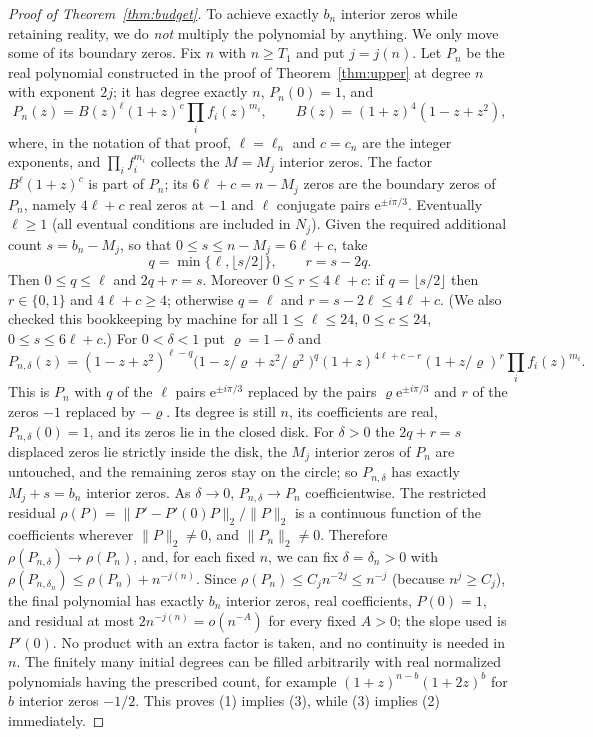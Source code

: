\documentclass[11pt]{article}
\theoremstyle{remark}\newtheorem{remark}[theorem]{Remark}
\newcommand{\norm}[1]{\lVert #1\rVert}
\newcommand{\ee}{\mathrm e}
\begin{document}
\begin{proof}[Proof of Theorem~\ref{thm:budget}]
To achieve exactly \(b_n\) interior zeros while retaining reality,
we do \emph{not} multiply the polynomial by anything. We only move
some of its boundary zeros. Fix \(n\) with \(n\ge T_1\) and put
\(j=j(n)\). Let \(P_n\) be the real polynomial constructed in the proof of
Theorem~\ref{thm:upper} at degree \(n\) with exponent \(2j\); it has degree
exactly \(n\), \(P_n(0)=1\), and
\[
 P_n(z)=B(z)^{\ell}(1+z)^{c}\prod_i f_i(z)^{m_i},
 \qquad B(z)=(1+z)^4(1-z+z^2),
\]
where, in the notation of that proof, \(\ell=\ell_n\) and \(c=c_n\) are the
integer exponents, and \(\prod_if_i^{m_i}\) collects the \(M=M_j\)
interior zeros. The factor \(B^\ell(1+z)^c\) is part of \(P_n\); its
\(6\ell+c=n-M_j\) zeros are the boundary zeros of \(P_n\), namely
\(4\ell+c\) real zeros at \(-1\) and \(\ell\) conjugate pairs
\(\ee^{\pm i\pi/3}\). Eventually \(\ell\ge1\) (all eventual conditions are included
in \(N_j\)). Given the required additional count \(s=b_n-M_j\), so that
\(0\le s\le n-M_j=6\ell+c\), take
\[
 q=\min\{\ell,\lfloor s/2\rfloor\},\qquad r=s-2q .
\]
Then \(0\le q\le\ell\) and \(2q+r=s\). Moreover \(0\le r\le4\ell+c\): if
\(q=\lfloor s/2\rfloor\) then \(r\in\{0,1\}\) and \(4\ell+c\ge4\);
otherwise \(q=\ell\) and \(r=s-2\ell\le4\ell+c\). (We also checked this
bookkeeping by machine for all \(1\le\ell\le24\), \(0\le c\le24\),
\(0\le s\le6\ell+c\).) For \(0<\delta<1\) put \(\varrho=1-\delta\) and
\[
 P_{n,\delta}(z)=(1-z+z^2)^{\ell-q}\bigl(1-z/\varrho+z^2/\varrho^2\bigr)^{q}
 (1+z)^{4\ell+c-r}(1+z/\varrho)^{r}\prod_if_i(z)^{m_i}.
\]
This is \(P_n\) with \(q\) of the \(\ell\) pairs \(\ee^{\pm i\pi/3}\)
replaced by the pairs \(\varrho\ee^{\pm i\pi/3}\) and \(r\) of the zeros
\(-1\) replaced by \(-\varrho\). Its degree is still \(n\), its coefficients are
real, \(P_{n,\delta}(0)=1\), and its zeros lie in the closed disk. For
\(\delta>0\) the \(2q+r=s\) displaced zeros lie strictly inside the disk,
the \(M_j\) interior zeros of \(P_n\) are untouched, and the remaining
zeros stay on the circle; so \(P_{n,\delta}\) has exactly
\(M_j+s=b_n\) interior zeros. As \(\delta\to0\), \(P_{n,\delta}\to P_n\)
coefficientwise. The restricted residual
\(\rho(P)=\norm{P'-P'(0)P}_2/\norm P_2\) is a continuous function of the
coefficients wherever \(\norm P_2\ne0\), and \(\norm{P_n}_2\ne0\). Therefore
\(\rho(P_{n,\delta})\to\rho(P_n)\), and, for each fixed \(n\), we can fix
\(\delta=\delta_n>0\) with \(\rho(P_{n,\delta_n})\le\rho(P_n)+n^{-j(n)}\).
Since \(\rho(P_n)\le C_{j}n^{-2j}\le n^{-j}\) (because \(n^j\ge C_j\)), the
final polynomial has exactly \(b_n\) interior zeros, real coefficients,
\(P(0)=1\), and residual at most \(2n^{-j(n)}=o(n^{-A})\) for every fixed
\(A>0\); the slope used is \(P'(0)\). No product with an extra factor is
taken, and no continuity is needed in \(n\).
The finitely many initial degrees can be filled arbitrarily with
real normalized polynomials having the prescribed count, for example
\((1+z)^{n-b}(1+2z)^{b}\) for \(b\) interior zeros \(-1/2\).
This proves (1) implies (3), while (3) implies (2) immediately.


\end{proof}
\end{document}
